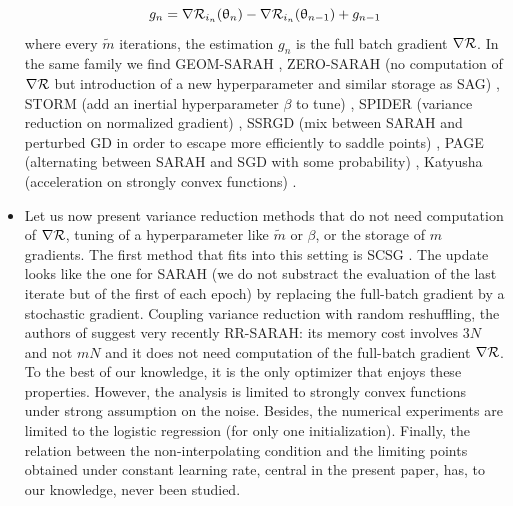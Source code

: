 \documentclass[article,authoryear,jmlmc]{beg_32}             %
\begin{document}
\begin{itemize}
\begin{equation*}
	g_n = \nabla \mathcal{R}_{i_n}(\uptheta_n)-\nabla \mathcal{R}_{i_n}(\uptheta_{n-1})+g_{n-1}
\end{equation*}
where every $\tilde{m}$ iterations, the estimation $g_n$ is the full batch gradient $\nabla \mathcal{R}$. In the same family we find GEOM-SARAH \cite{GEOM_SARAH}, ZERO-SARAH (no computation of $\nabla \mathcal{R}$ but introduction of a new hyperparameter and similar storage as SAG) \cite{ZERO_SARAH}, STORM (add an inertial hyperparameter $\beta$ to tune) \cite{STORM_first}, SPIDER (variance reduction on normalized gradient) \cite{SPIDER_first}, SSRGD (mix between SARAH and perturbed GD in order to escape more efficiently to saddle points) \cite{SSRGD}, PAGE (alternating between SARAH and SGD with some probability) \cite{PAGE}, Katyusha (acceleration on strongly convex functions) \cite{Katyusha}. 
\item Let us now present variance reduction methods that do not need computation of $\nabla \mathcal{R}$, tuning of a hyperparameter like $\tilde{m}$ or $\beta$, or the storage of $m$ gradients.
  The first method that fits into this setting is SCSG \cite{SCSG}. The update looks like the one for SARAH (we do not substract the evaluation of the last iterate but of the first
    of each epoch) by replacing the full-batch gradient by a stochastic gradient. Coupling variance reduction with random reshuffling, the authors of \cite{RR_SARAH} suggest very
    recently RR-SARAH: its memory cost involves $3N$ and not $mN$ and it does not need computation of the full-batch gradient $\nabla \mathcal{R}$. To the best of our knowledge, it is the only
    optimizer that enjoys these properties. However, the analysis is limited to strongly convex functions under strong assumption on the noise. Besides, the numerical experiments
    are limited to the logistic regression (for only one initialization). Finally, the relation between the non-interpolating condition and the limiting points obtained under
    constant learning rate, central in the present paper, has, to our knowledge, never been studied. 
\end{itemize}
\end{document}
